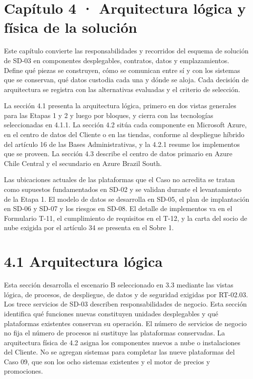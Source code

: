 \documentclass[11pt]{article}
\begin{document}
\tableofcontents
\clearpage

\section{Capítulo 4 · Arquitectura lógica y física de la solución}

Este capítulo convierte las responsabilidades y recorridos del esquema de solución de SD-03 en componentes desplegables, contratos, datos y emplazamientos. Define qué piezas se construyen, cómo se comunican entre sí y con los sistemas que se conservan, qué datos custodia cada una y dónde se aloja. Cada decisión de arquitectura se registra con las alternativas evaluadas y el criterio de selección.

La sección 4.1 presenta la arquitectura lógica, primero en dos vistas generales para las Etapas 1 y 2 y luego por bloques, y cierra con las tecnologías seleccionadas en 4.1.1. La sección 4.2 sitúa cada componente en Microsoft Azure, en el centro de datos del Cliente o en las tiendas, conforme al despliegue híbrido del artículo 16 de las Bases Administrativas, y la 4.2.1 resume los implementos que se proveen. La sección 4.3 describe el centro de datos primario en Azure Chile Central y el secundario en Azure Brazil South.

Las ubicaciones actuales de las plataformas que el Caso no acredita se tratan como supuestos fundamentados en SD-02 y se validan durante el levantamiento de la Etapa 1. El modelo de datos se desarrolla en SD-05, el plan de implantación en SD-06 y SD-07 y los riesgos en SD-08. El detalle de implementos va en el Formulario T-11, el cumplimiento de requisitos en el T-12, y la carta del socio de nube exigida por el artículo 34 se presenta en el Sobre 1.

\section{4.1 Arquitectura lógica}

Esta sección desarrolla el escenario B seleccionado en 3.3 mediante las vistas lógica, de procesos, de despliegue, de datos y de seguridad exigidas por RT-02.03. Los trece servicios de SD-03 describen responsabilidades de negocio. Esta sección identifica qué funciones nuevas constituyen unidades desplegables y qué plataformas existentes conservan su operación. El número de servicios de negocio no fija el número de procesos ni sustituye las plataformas conservadas. La arquitectura física de 4.2 asigna los componentes nuevos a nube o instalaciones del Cliente. No se agregan sistemas para completar las nueve plataformas del Caso 09, que son los ocho sistemas existentes y el motor de precios y promociones.
\end{document}
